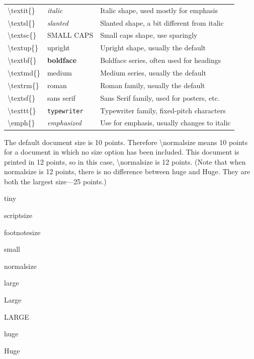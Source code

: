 \documentclass[a4paper,11pt,UTF8,openright]{book}
\begin{document}
\begin{center}
\begin{tabular}{|p{}p{}p{}|}
  \hline
  \textbackslash textit\{\} & \textit{italic} & Italic shape, used mostly for emphasis\\
  \textbackslash textsl\{\} & \textsl{slanted} & Slanted shape, a bit different from italic\\
  \textbackslash textsc\{\} & \textsc{SMALL CAPS} & Small caps shape, use sparingly\\
  \textbackslash textup\{\} & \textup{upright} & Upright shape, usually the default\\
  \textbackslash textbf\{\} & \textbf{boldface} & Boldface series, often used for headings\\
  \textbackslash textmd\{\} & \textmd{medium} & Medium series, usually the default\\
  \textbackslash textrm\{\} & \textrm{roman} & Roman family, usually the default\\
  \textbackslash textsf\{\} & \textsf{sans serif} & Sans Serif family, used for posters, etc.\\	
  \textbackslash texttt\{\} & \texttt{typewriter} & Typewriter family, fixed-pitch characters\\
  \textbackslash emph\{\} & \emph{emphasized} & Use for emphasis, usually changes to italic\\
  \hline	
\end{tabular}
\end{center}

The default document size is 10 points. Therefore \textbackslash normalsize means 10 points for a document in which no size option has been included. This document is printed in 12 points, so in this case, \textbackslash normalsize is 12 points. (Note that when normalsize is 12 points, there is no difference between huge and Huge. They are both the largest size—25 points.)

{\tiny tiny}

{\scriptsize scriptsize}

{\footnotesize footnotesize}

{\small small}

{\normalsize normalsize}

{\large large}

{\Large Large}

{\LARGE LARGE}

{\huge huge}

{\Huge Huge}
\end{document}
